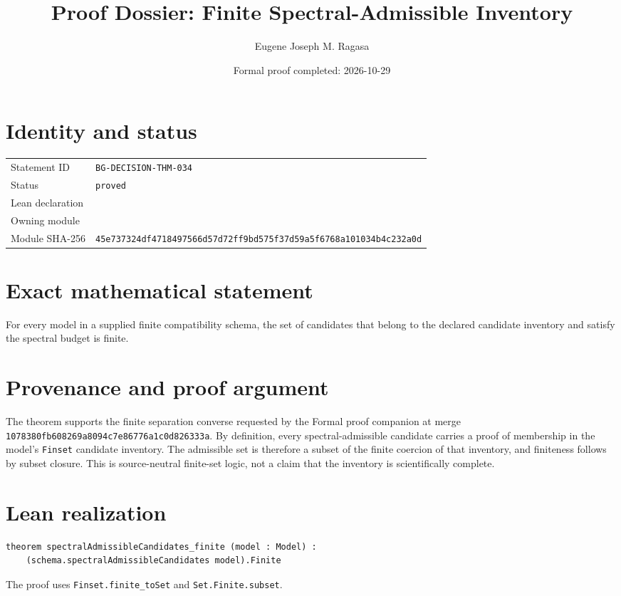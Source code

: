 \documentclass[11pt]{article}
\title{Proof Dossier: Finite Spectral-Admissible Inventory}
\author{Eugene Joseph M. Ragasa}
\date{Formal proof completed: 2026-10-29}
\begin{document}
\maketitle
\section{Identity and status}
\begin{tabularx}{\textwidth}{@{}lY@{}}\toprule
Statement ID & \texttt{BG-DECISION-THM-034} \\
Status & \texttt{proved} \\
Lean declaration &  \\
Owning module &  \\
Module SHA-256 & \texttt{45e737324df4718497566d57d72ff9bd575f37d59a5f6768a101034b4c232a0d} \\
\bottomrule\end{tabularx}
\section{Exact mathematical statement}
For every model in a supplied finite compatibility schema, the set of candidates that
belong to the declared candidate inventory and satisfy the spectral budget is finite.
\section{Provenance and proof argument}
The theorem supports the finite separation converse requested by the Formal proof
companion at merge \texttt{1078380fb608269a8094c7e86776a1c0d826333a}. By definition,
every spectral-admissible candidate carries a proof of membership in the model's
\texttt{Finset} candidate inventory. The admissible set is therefore a subset of the
finite coercion of that inventory, and finiteness follows by subset closure. This is
source-neutral finite-set logic, not a claim that the inventory is scientifically
complete.
\section{Lean realization}
\begin{lstlisting}
theorem spectralAdmissibleCandidates_finite (model : Model) :
    (schema.spectralAdmissibleCandidates model).Finite
\end{lstlisting}
The proof uses \texttt{Finset.finite\_toSet} and \texttt{Set.Finite.subset}.
\end{document}
